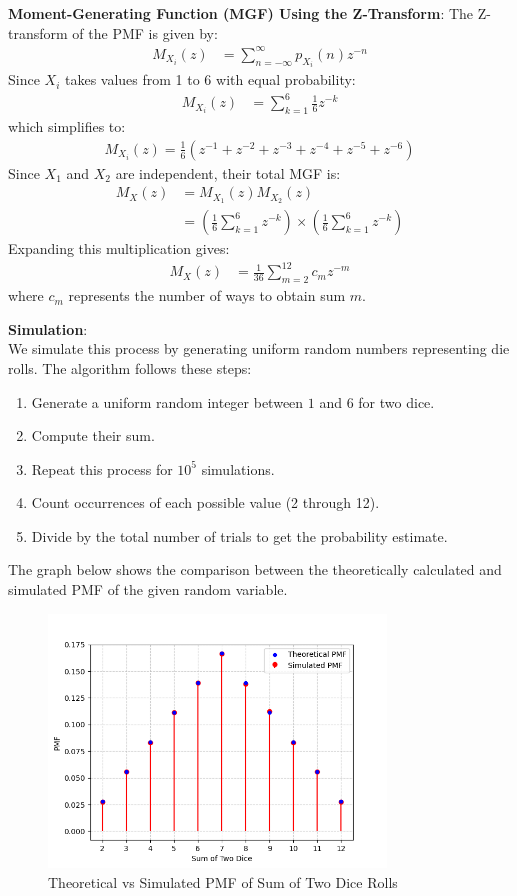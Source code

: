 \documentclass[journal]{IEEEtran}
\begin{document}
\textbf{Moment-Generating Function (MGF) Using the Z-Transform}:
The Z-transform of the PMF is given by:
\begin{align}
    M_{X_i}(z) &= \sum_{n=-\infty}^{\infty} p_{X_i}(n) z^{-n}
\end{align}
Since $X_i$ takes values from 1 to 6 with equal probability:
\begin{align}
    M_{X_i}(z) &= \sum_{k=1}^{6} \frac{1}{6} z^{-k}
\end{align}
which simplifies to:
\begin{align}
    M_{X_i}(z) = \frac{1}{6} \left( z^{-1} + z^{-2} + z^{-3} + z^{-4} + z^{-5} + z^{-6} \right)
\end{align}
Since $X_1$ and $X_2$ are independent, their total MGF is:
\begin{align}
    M_X(z) &= M_{X_1}(z) M_{X_2}(z) \\
    &= \left( \frac{1}{6} \sum_{k=1}^{6} z^{-k} \right) \times \left( \frac{1}{6} \sum_{k=1}^{6} z^{-k} \right)
\end{align}
Expanding this multiplication gives:
\begin{align}
    M_X(z) &= \frac{1}{36} \sum_{m=2}^{12} c_m z^{-m}
\end{align}
where $c_m$ represents the number of ways to obtain sum $m$.

\textbf{Simulation}:\\
We simulate this process by generating uniform random numbers representing die rolls. The algorithm follows these steps:
\begin{enumerate}
    \item Generate a uniform random integer between $1$ and $6$ for two dice.
    \item Compute their sum.
    \item Repeat this process for $10^5$ simulations.
    \item Count occurrences of each possible value (2 through 12).
    \item Divide by the total number of trials to get the probability estimate.
\end{enumerate}

The graph below shows the comparison between the theoretically calculated and simulated PMF of the given random variable.

\begin{figure}[htbp]
  \centering
  \includegraphics[width=0.8\textwidth]{figs/Figure_1.png} %
  \caption{Theoretical vs Simulated PMF of Sum of Two Dice Rolls}
  \label{fig:pmf}
\end{figure}
\end{document}
